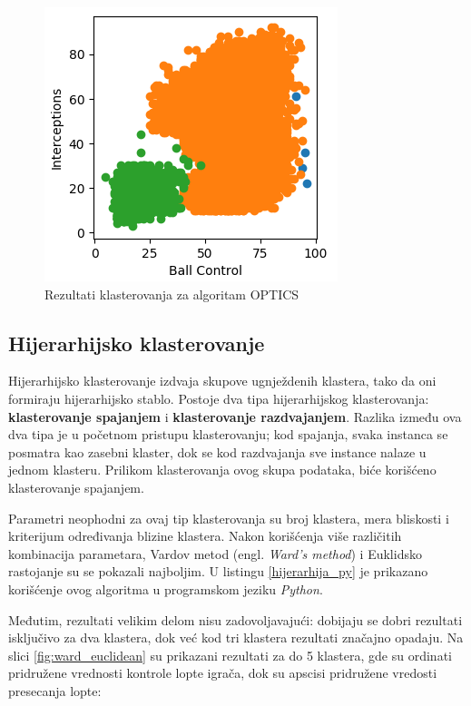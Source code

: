 \documentclass[a4paper]{article}
\begin{document}
\begin{figure}[h!]
\begin{center}
\includegraphics{images/optics.png}
\end{center}
\caption{Rezultati klasterovanja za algoritam OPTICS}
\label{fig:optics}
\end{figure}

\subsection{Hijerarhijsko klasterovanje}
\label{subsec:hijerarhijsko}

Hijerarhijsko klasterovanje izdvaja skupove ugnježdenih klastera, tako da oni formiraju hijerarhijsko stablo. Postoje dva tipa hijerarhijskog klasterovanja: \textbf{klasterovanje spajanjem} i \textbf{klasterovanje razdvajanjem}. Razlika između ova dva tipa je u početnom pristupu klasterovanju; kod spajanja, svaka instanca se posmatra kao zasebni klaster, dok se kod razdvajanja sve instance nalaze u jednom klasteru. Prilikom klasterovanja ovog skupa podataka, biće korišćeno klasterovanje spajanjem. 

Parametri neophodni za ovaj tip klasterovanja su broj klastera, mera bliskosti i kriterijum određivanja blizine klastera. Nakon korišćenja više različitih kombinacija parametara, Vardov metod\cite{ward} (engl. \textit{Ward's method}) i Euklidsko rastojanje su se pokazali najboljim. U listingu \ref{hijerarhija_py} je prikazano korišćenje ovog algoritma u programskom jeziku \textit{Python}.



Međutim, rezultati velikim delom nisu zadovoljavajući: dobijaju se dobri rezultati isključivo za dva klastera, dok već kod tri klastera rezultati značajno opadaju. Na slici \ref{fig:ward_euclidean} su prikazani rezultati za do 5 klastera, gde su ordinati pridružene vrednosti kontrole lopte igrača, dok su apscisi pridružene vredosti presecanja lopte:
\end{document}
